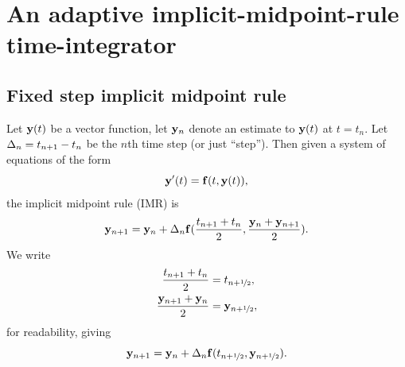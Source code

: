 \newcommand{\ltip}[2]{\ip{#1}{#2}_{\ltwo}}

\newcommand{\mpm}{\frac{\mv_{n+1} + \mv_n}{2}}
\newcommand{\mpt}{\frac{t_n + t_{n+1}}{2}}
\newcommand{\mpdmdt}{\frac{\mv_{n+1} - \mv_n}{\dtn}}
\newcommand{\mphop}{\hop \left[ \mpm \right]}
\newcommand{\mphapp}{\happ \left(\mpt \right)}

\newcommand{\ltnorm}[1]{\norm{#1}_{\ltwo}}


\section{An adaptive implicit-midpoint-rule time-integrator}




\subsection{Fixed step implicit midpoint rule}

Let $\mathbf{y}(t)$ be a vector function, let $\mathbf{y}_n$ denote an estimate to $\mathbf{y}(t)$ at $t = t_n$.
Let $\Delta_{n} = t_{n+1} - t_n$ be the $n$th time step (or just ``step'').
Then given a system of equations of the form
\begin{equation}
  \mathbf{y}'(t) = {\mathbf{f}}(t, \mathbf{y}(t)),
  \label{eq:43}
\end{equation}
the implicit midpoint rule (IMR) is
\begin{equation}
    \mathbf{y}_{n+1} = \mathbf{y}_n + \Delta_{n} {\mathbf{f}}(\frac{t_{n+1} + t_n}{2}, \frac{\mathbf{y}_n + \mathbf{y}_{n+1}}{2}).
    \notag
\end{equation}
We write
\begin{equation}
  \begin{aligned}
    \frac{t_{n+1} + t_n}{2} &= t_{n+\nicefrac{1}{2}}, \\
    \frac{\mathbf{y}_{n+1} + \mathbf{y}_n}{2} &= \mathbf{y}_{n+\nicefrac{1}{2}},
  \end{aligned}
\end{equation}
for readability, giving
\begin{equation}
  \mathbf{y}_{n+1} = \mathbf{y}_n + \Delta_{n} {\mathbf{f}}(t_{n+\nicefrac{1}{2}}, \mathbf{y}_{n+\nicefrac{1}{2}}).
  \label{eq:basic-midpoint}
\end{equation}

